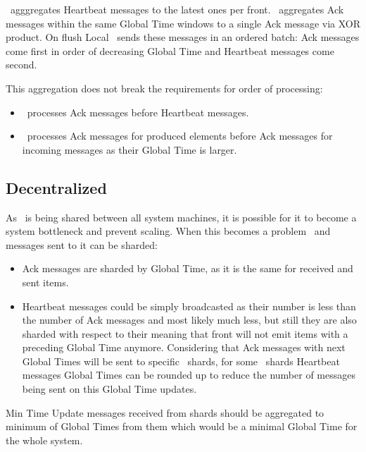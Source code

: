 \tracker\ agggregates Heartbeat messages to the latest ones per front. \tracker\ aggregates Ack messages within the same Global Time windows to a single Ack message via XOR product. On flush Local \tracker\ sends these messages in an ordered batch: Ack messages come first in order of decreasing Global Time and Heartbeat messages come second.

This aggregation does not break the requirements for order of processing:
\begin{itemize}
	\item \tracker\ processes Ack messages before Heartbeat messages.
	\item \tracker\ processes Ack messages for produced elements before Ack messages for incoming messages as their Global Time is larger.
\end{itemize}

\subsection{Decentralized \tracker\ }

As \tracker\ is being shared between all system machines, it is possible for it to become a system bottleneck and prevent scaling. When this becomes a problem \tracker\ and messages sent to it can be sharded:
\begin{itemize}
	\item Ack messages are sharded by Global Time, as it is the same for received and sent items.
	\item Heartbeat messages could be simply broadcasted as their number is less than the number of Ack messages and most likely much less, but still they are also sharded with respect to their meaning that front will not emit items with a preceding Global Time anymore. Considering that Ack messages with next Global Times will be sent to specific \tracker\ shards, for some \tracker\ shards Heartbeat messages Global Times can be rounded up to reduce the number of messages being sent on this Global Time updates.
\end{itemize}

Min Time Update messages received from shards should be aggregated to minimum of Global Times from them which would be a minimal Global Time for the whole system.


